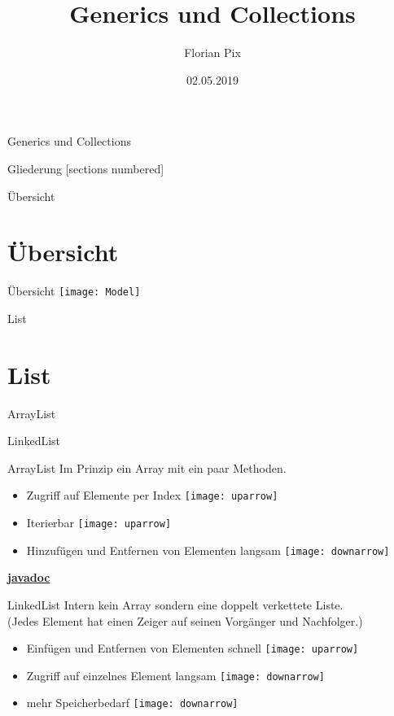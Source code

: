 \documentclass[10pt]{beamer}
\author{Florian Pix}
\institute{SWT Übung SoSe19}
\title{Generics und Collections}
\date{02.05.2019}
\begin{document}
\begin{frame}{Generics und Collections}
    \titlepage
\end{frame}

\begin{frame}{Gliederung}
    [sections numbered]
    \tableofcontents
\end{frame}

\begin{frame}[fragile]{Übersicht}
    \section{Übersicht}
\end{frame}

\begin{frame}[fragile]{Übersicht}
\texttt{[image: Model]}
\end{frame}

\begin{frame}[fragile]{List}
    \section{List}
ArrayList

LinkedList
\end{frame}

\begin{frame}[fragile]{ArrayList}
Im Prinzip ein Array mit ein paar Methoden.

\begin{itemize}
\item Zugriff auf Elemente per Index \texttt{[image: uparrow]}
\item Iterierbar \texttt{[image: uparrow]}
\item Hinzufügen und Entfernen von Elementen langsam \texttt{[image: downarrow]}
\end{itemize}

\textcolor{mymauve}{\textbf{\href{https://docs.oracle.com/javase/8/docs/api/java/util/ArrayList.html}{javadoc}}}
\end{frame}

\begin{frame}[fragile]{LinkedList}
Intern kein Array sondern eine doppelt verkettete Liste.\\
(Jedes Element hat einen Zeiger auf seinen Vorgänger und Nachfolger.)

\begin{itemize}
\item Einfügen und Entfernen von Elementen schnell \texttt{[image: uparrow]}
\item Zugriff auf einzelnes Element langsam \texttt{[image: downarrow]}
\item mehr Speicherbedarf \texttt{[image: downarrow]}
\end{itemize}
\end{frame}
\end{document}
